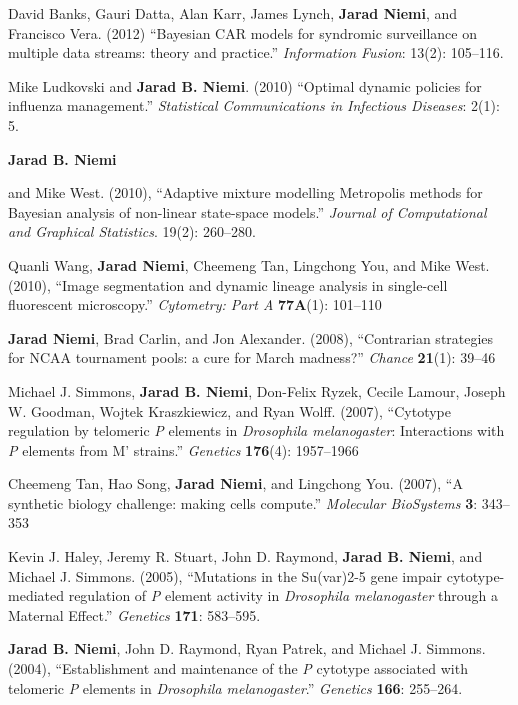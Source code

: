 \documentclass[overlapped,line,letterpaper]{res}
\begin{document}
\begin{resume}
David Banks, Gauri Datta, Alan Karr, James Lynch, {\bf Jarad Niemi}, and Francisco Vera. (2012) ``Bayesian CAR models for syndromic surveillance on multiple data streams: theory and practice.'' \emph{Information Fusion}: 13(2): 105--116.

Mike Ludkovski and {\bf Jarad B. Niemi}. (2010) ``Optimal dynamic policies for influenza management.'' \emph{Statistical Communications in Infectious Diseases}: 2(1): 5.

\newpage \opening

{\bf Jarad B. Niemi} and Mike West. (2010), ``Adaptive mixture modelling Metropolis methods for Bayesian analysis of non-linear state-space models.'' \emph{Journal of Computational and Graphical Statistics}. 19(2): 260--280.

Quanli Wang, {\bf Jarad Niemi}, Cheemeng Tan, Lingchong You, and Mike West. (2010), ``Image segmentation and dynamic lineage analysis in single-cell fluorescent microscopy.'' \emph{Cytometry: Part A} {\bf 77A}(1): 101--110

{\bf Jarad Niemi}, Brad Carlin, and Jon Alexander. (2008), ``Contrarian strategies for NCAA tournament pools: a cure for March madness?'' \emph{Chance} {\bf 21}(1): 39--46


Michael J. Simmons, {\bf Jarad B. Niemi}, Don-Felix Ryzek, Cecile Lamour, Joseph W. Goodman, Wojtek Kraszkiewicz, and Ryan Wolff. (2007), ``Cytotype regulation by telomeric \emph{P} elements in \emph{Drosophila melanogaster}: Interactions with \emph{P} elements from M' strains.'' \emph{Genetics} {\bf 176}(4): 1957--1966

Cheemeng Tan, Hao Song, {\bf Jarad Niemi}, and Lingchong You. (2007), ``A synthetic biology challenge: making cells compute.'' \emph{Molecular BioSystems}  {\bf 3}: 343--353

Kevin J. Haley, Jeremy R. Stuart, John D. Raymond, {\bf Jarad B. Niemi}, and Michael J. Simmons. (2005), ``Mutations in the Su(var)2-5 gene impair cytotype-mediated regulation of \emph{P} element activity in \emph{Drosophila melanogaster} through a Maternal Effect.'' \emph{Genetics} {\bf 171}: 583--595.

{\bf Jarad B. Niemi}, John D. Raymond, Ryan Patrek, and Michael J. Simmons. (2004), ``Establishment and maintenance of the \emph{P} cytotype associated with telomeric \emph{P} elements in \emph{Drosophila melanogaster}.'' \emph{Genetics} {\bf 166}: 255--264.


\end{resume}
\end{document}
